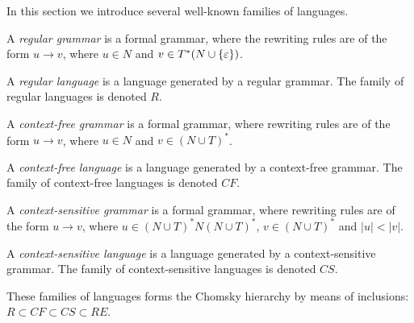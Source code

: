 In this section we introduce several well-known families of languages.

\begin{definition}
A {\em regular grammar} is a formal grammar, where the rewriting rules are of the form $u\rightarrow v$, where $u\in N$ and $v\in T^*(N\cup \{\varepsilon\})$.
\end{definition}

\begin{definition}
A {\em regular language} is a language generated by a regular grammar. The family of regular languages is denoted $R$.
\end{definition}

\begin{definition}
A {\em context-free grammar} is a formal grammar, where rewriting rules are of the form $u\rightarrow v$, where $u\in N$ and $v\in (N\cup T)^*$.
\end{definition}

\begin{definition}
A {\em context-free language} is a language generated by a context-free grammar. The family of context-free languages is denoted $CF$.
\end{definition}

\begin{definition}
A {\em context-sensitive grammar} is a formal grammar, where rewriting rules are of the form $u\rightarrow v$, where $u\in (N\cup T)^*N(N\cup T)^*$, $v\in (N\cup T)^*$ and $|u| < |v|$.
\end{definition}

\begin{definition}
A {\em context-sensitive language} is a language generated by a context-sensitive grammar. The family of context-sensitive languages is denoted $CS$.
\end{definition}

These families of languages forms the Chomsky hierarchy by means of inclusions: $R \subset CF \subset CS \subset RE$.
